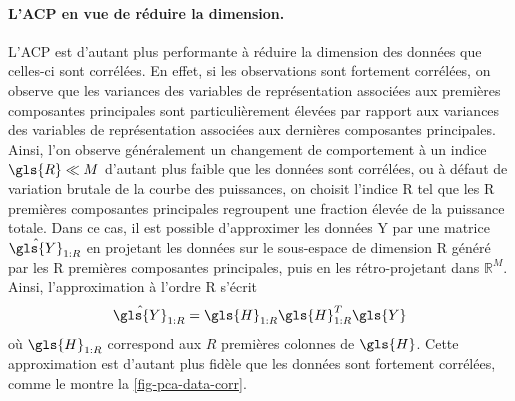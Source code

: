     \paragraph{L'ACP en vue de réduire la dimension.} L'ACP est d'autant plus performante à réduire la dimension des données que celles-ci sont corrélées. En effet, si les observations sont fortement corrélées, on observe que les variances des variables de représentation associées aux premières composantes principales sont particulièrement élevées par rapport aux variances des variables de représentation associées aux dernières composantes principales.
    Ainsi, l'on observe généralement un changement de comportement à un indice $\gls{R}\ll M$ d'autant plus faible que les données sont corrélées, ou à défaut de variation brutale de la courbe des puissances, on choisit l'indice \gls{R} tel que les \gls{R} premières composantes principales regroupent une fraction élevée de la puissance totale.
    Dans ce cas, il est possible d'approximer les données \gls{Y} par une matrice $\hat{\gls{Y}}_{1:R}$ en projetant les données sur le sous-espace de dimension \gls{R} généré par les \gls{R} premières composantes principales, puis en les rétro-projetant dans $\mathbb{R}^M$. Ainsi, l'approximation à l'ordre \gls{R} s'écrit
    \begin{equation}
    \hat{\gls{Y}}_{1:R} = \gls{H}_{1:R}\gls{H}_{1:R}^T\gls{Y}
    \end{equation}
    où $\gls{H}_{1:R}$ correspond aux $R$ premières colonnes de $\gls{H}$. Cette approximation est d'autant plus fidèle que les données sont fortement corrélées, comme le montre la \cref{fig-pca-data-corr}.

